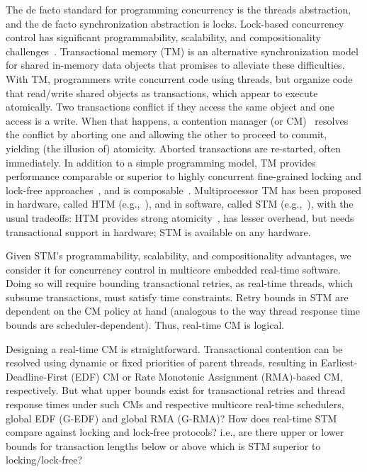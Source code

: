 \documentclass[a4paper,english]{article}
\begin{document}
The de facto standard for programming concurrency is the threads abstraction, and the de facto synchronization abstraction is locks. 
Lock-based concurrency control has significant programmability, scalability, and compositionality challenges~\cite{Herlihy:2006:AMP:1146381.1146382}. Transactional memory (TM) is an alternative synchronization model for shared in-memory data objects that promises to alleviate these difficulties.  With TM, programmers write concurrent code using threads, but organize code that read/write shared objects as transactions, which appear to execute atomically. Two transactions conflict if they access the same object and one access is a write. When that happens, a contention manager (or CM)~\cite{Guerraoui:2005:TTT:1073814.1073863} resolves the conflict by aborting one and allowing the other to proceed to commit, yielding (the illusion of) atomicity. Aborted transactions are re-started, often immediately.  In addition to a simple programming model, TM provides performance comparable or superior to highly concurrent fine-grained locking and lock-free approaches~\cite{Saha:2006:MHP:1122971.1123001}, and is composable~\cite{Harris:2005:CMT:1065944.1065952}. Multiprocessor TM has been proposed in hardware, called HTM (e.g.,~\cite{austenmc:tcc:dissertation:2009}), and in software, called STM (e.g.,~\cite{sha95}), with the usual tradeoffs: HTM provides strong atomicity~\cite{austenmc:tcc:dissertation:2009}, has lesser overhead, but needs transactional support in hardware; STM is available on any hardware.


Given STM's programmability, scalability, and compositionality advantages, we consider it for concurrency control in multicore embedded real-time software. Doing so will require bounding transactional  retries, as real-time threads, which subsume transactions, must satisfy time constraints.  Retry bounds in STM are dependent on the CM policy at hand (analogous to the way thread response time bounds are scheduler-dependent). Thus, real-time CM is logical.

Designing a real-time CM is straightforward. Transactional contention can be resolved using dynamic or fixed priorities of parent threads, resulting in Earliest-Deadline-First (EDF) CM or Rate Monotonic Assignment (RMA)-based CM, respectively. But what upper bounds exist for transactional retries and thread response times under such CMs and respective multicore real-time schedulers, global EDF (G-EDF) and global RMA (G-RMA)? How does real-time STM compare against locking and lock-free protocols? i.e., are there upper or lower bounds for transaction lengths below or above which is STM superior to locking/lock-free?
\end{document}
